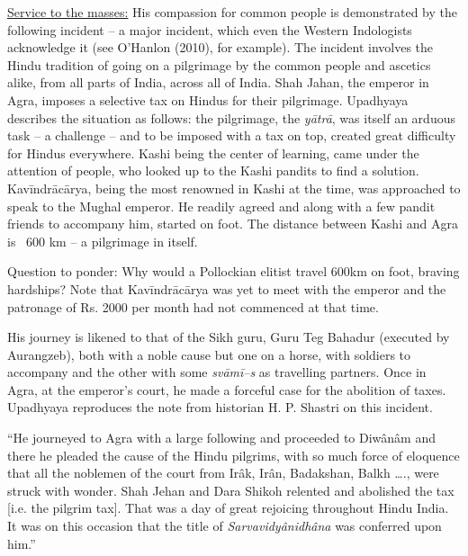 \begin{enumerate}
 \underline{Service to the masses:} His compassion for common people is demonstrated by the following incident – a major incident, which even the Western Indologists acknowledge it (see O’Hanlon (2010), for example). The incident involves the Hindu tradition of going on a pilgrimage by the common people and ascetics alike, from all parts of India, across all of India. Shah Jahan, the emperor in Agra, imposes a selective tax on Hindus for their pilgrimage. Upadhyaya describes the situation as follows: the pilgrimage, the \textit{yātrā}, was itself an arduous task – a challenge – and to be imposed with a tax on top, created great difficulty for Hindus everywhere. Kashi being the center of learning, came under the attention of people, who looked up to the Kashi pandits to find a solution. Kavīndrācārya, being the most renowned in Kashi at the time, was approached to speak to the Mughal emperor. He readily agreed and along with a few pandit friends to accompany him, started on foot. The distance between Kashi and Agra is ~600 km – a pilgrimage in itself.

 Question to ponder: Why would a Pollockian elitist travel 600km on foot, braving hardships? Note that Kavīndrācārya was yet to meet with the emperor and the patronage of Rs. 2000 per month had not commenced at that time.

 His journey is likened to that of the Sikh guru, Guru Teg Bahadur (executed by Aurangzeb), both with a noble cause but one on a horse, with soldiers to accompany and the other with some \textit{svāmī--s} as travelling partners. Once in Agra, at the emperor’s court, he made a forceful case for the abolition of taxes. Upadhyaya reproduces the note from historian H. P. Shastri on this incident.

\begin{myquote}
“He journeyed to Agra with a large following and proceeded to Diwânâm and there he pleaded the cause of the Hindu pilgrims, with so much force of eloquence that all the noblemen of the court from Irâk, Irân, Badakshan, Balkh …., were struck with wonder. Shah Jehan and Dara Shikoh relented and abolished the tax [i.e. the pilgrim tax]. That was a day of great rejoicing throughout Hindu India. It was on this occasion that the title of \textit{Sarvavidyânidhâna} was conferred upon him.” 


\end{myquote}
\end{enumerate}
